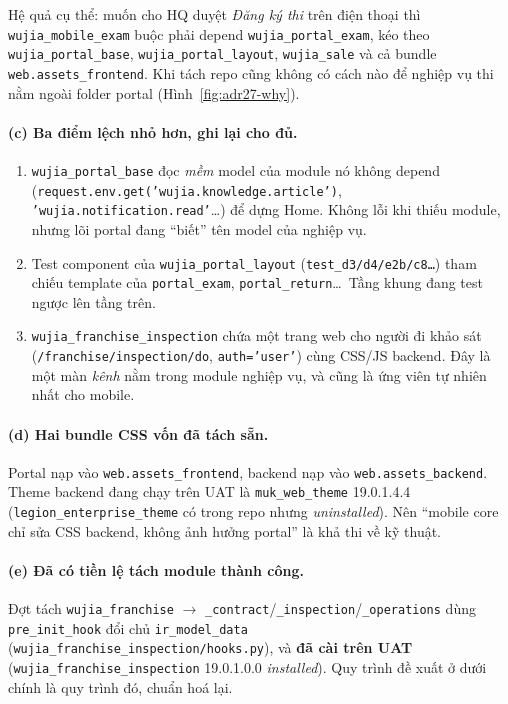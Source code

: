Hệ quả cụ thể: muốn cho HQ duyệt \emph{Đăng ký thi} trên điện thoại thì
\texttt{wujia\_mobile\_exam} buộc phải depend \texttt{wujia\_portal\_exam}, kéo theo
\texttt{wujia\_portal\_base}, \texttt{wujia\_portal\_layout}, \texttt{wujia\_sale} và cả bundle
\texttt{web.assets\_frontend}. Khi tách repo cũng không có cách nào để nghiệp vụ thi nằm ngoài
folder portal (Hình~\ref{fig:adr27-why}).

\adrWhyFigure

\paragraph{(c) Ba điểm lệch nhỏ hơn, ghi lại cho đủ.}
\begin{enumerate}
\item \texttt{wujia\_portal\_base} đọc \emph{mềm} model của module nó không depend
  (\texttt{request.env.get('wujia.knowledge.article')}, \texttt{'wujia.notification.read'}\ldots)
  để dựng Home. Không lỗi khi thiếu module, nhưng lõi portal đang ``biết'' tên model của nghiệp vụ.
\item Test component của \texttt{wujia\_portal\_layout} (\texttt{test\_d3/d4/e2b/c8\ldots})
  tham chiếu template của \texttt{portal\_exam}, \texttt{portal\_return}\ldots\ Tầng khung đang
  test ngược lên tầng trên.
\item \texttt{wujia\_franchise\_inspection} chứa một trang web cho người đi khảo sát
  (\texttt{/franchise/inspection/do}, \texttt{auth='user'}) cùng CSS/JS backend. Đây là một màn
  \emph{kênh} nằm trong module nghiệp vụ, và cũng là ứng viên tự nhiên nhất cho mobile.
\end{enumerate}

\paragraph{(d) Hai bundle CSS vốn đã tách sẵn.} Portal nạp vào \texttt{web.assets\_frontend}, backend
nạp vào \texttt{web.assets\_backend}. Theme backend đang chạy trên UAT là
\texttt{muk\_web\_theme} 19.0.1.4.4 (\texttt{legion\_enterprise\_theme} có trong repo nhưng
\emph{uninstalled}). Nên ``mobile core chỉ sửa CSS backend, không ảnh hưởng portal'' là khả thi
về kỹ thuật.

\paragraph{(e) Đã có tiền lệ tách module thành công.} Đợt tách \texttt{wujia\_franchise}
$\rightarrow$ \texttt{\_contract}/\texttt{\_inspection}/\texttt{\_operations} dùng
\texttt{pre\_init\_hook} đổi chủ \texttt{ir\_model\_data}
(\texttt{wujia\_franchise\_inspection/hooks.py}), và \textbf{đã cài trên UAT}
(\texttt{wujia\_franchise\_inspection} 19.0.1.0.0 \emph{installed}). Quy trình đề xuất ở dưới
chính là quy trình đó, chuẩn hoá lại.

